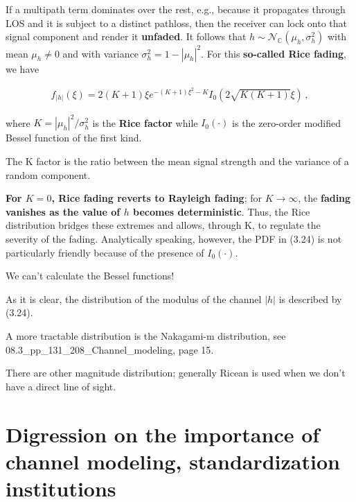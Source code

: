 \documentclass[a4paper, 12pt]{book}
\begin{document}
If a multipath term dominates over the rest, e.g., because it propagates through LOS and it is subject to a distinct pathloss, then the receiver can lock onto that signal component and render it \textbf{unfaded}. It follows that $h \sim \mathcal{N}_{\mathbb{C}}(\mu_h, \sigma_h^2)$ with mean $\mu_h \neq 0$ and with variance $\sigma_h^2 = 1 - |\mu_h|^2$. For this \textbf{so-called Rice fading}, we have

\begin{align}
f_{|h|}(\xi) = 2(K+1)\xi e^{-(K+1)\xi^2 - K} I_0 \left( 2\sqrt{K(K+1)}\xi \right) \,, \tag{3.24}
\end{align}

where $K = |\mu_h|^2 / \sigma_h^2$ is the \textbf{Rice factor} while $I_0(\cdot)$ is the zero-order modified Bessel function of the first kind.

\begin{bluebox}
The K factor is the ratio between the mean signal strength and the variance of a random component.
\end{bluebox}

\textbf{For $K=0$, Rice fading reverts to Rayleigh fading}; for $K \to \infty$, the \textbf{fading vanishes as the value of $h$ becomes deterministic}. Thus, the Rice distribution bridges these extremes and allows, through K, to regulate the severity of the fading. Analytically speaking, however, the PDF in (3.24) is not particularly friendly because of the presence of $I_0(\cdot)$.

\begin{greenbar}
We can't calculate the Bessel functions!
\end{greenbar}

\begin{purplebox}
As it is clear, the distribution of the modulus of the channel $|h|$ is described by (3.24).
\end{purplebox}

A more tractable distribution is the Nakagami-m distribution, see \textcolor{green!60!black}{08.3\_pp\_131\_208\_Channel\_modeling, page 15}.

There are other magnitude distribution; generally Ricean is used when we don't have a direct line of sight.

\newpage

\section[Importance of channel modeling]{Digression on the importance of channel modeling, standardization institutions}
\end{document}
